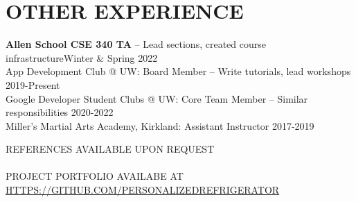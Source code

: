 \documentclass[12pt,letterpaper]{extarticle}
\begin{document}
  \section{OTHER EXPERIENCE}
  \textbf{Allen School CSE 340 TA} -- {\footnotesize Lead sections, created course infrastructure}\hfill Winter \& Spring 2022\\
  App Development Club @ UW: Board Member -- {\footnotesize Write tutorials, lead workshops} \hfill 2019-Present\\
  Google Developer Student Clubs @ UW: Core Team Member -- {\footnotesize Similar responsibilities} \hfill 2020-2022\\
  Miller's Martial Arts Academy, Kirkland: Assistant Instructor \hfill 2017-2019

  \begin{center}
    REFERENCES AVAILABLE UPON REQUEST\\\phantom{;}\\
    PROJECT PORTFOLIO AVAILABE AT \url{HTTPS://GITHUB.COM/PERSONALIZEDREFRIGERATOR}
  \end{center}
\end{document}
